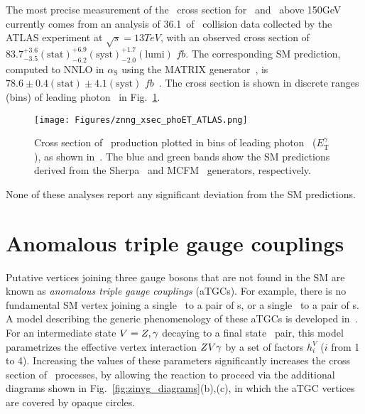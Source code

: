 The most precise measurement of the \zinvg\ cross section for \pTgamma\ and \MET\ above 150\unit{GeV} currently comes from an analysis of 36.1\fbinv\ of \Pp\Pp\ collision data
collected by the ATLAS experiment at $\sqrt{s} = 13\unit{TeV}$, with an observed cross section of $83.7^{+3.6}_{-3.5}\mathrm{(stat)}^{+6.9}_{-6.2}\mathrm{(syst)}^{+1.7}_{-2.0}\mathrm{(lumi)}$ $fb$.
The corresponding SM prediction, computed to NNLO in $\alpha_\mathrm{S}$ using the MATRIX generator~\cite{ref:epjc/s10052-018-5771-7}, is $78.6 \pm 0.4\mathrm{(stat)} \pm 4.1\mathrm{(syst)}$ $fb$~\cite{ref:CERN-EP-2018-220}.
The cross section is shown in discrete ranges (bins) of leading photon \pT\ in Fig.~\ref{fig:znng_xsec_phoET_ATLAS}.

\begin{figure}[hbtp]
  \begin{center}
    \texttt{[image: Figures/znng\_xsec\_phoET\_ATLAS.png]}
    \caption{
      Cross section of \zinvg\ production plotted in bins of leading photon \pT\ ($E^{\gamma}_\mathrm{T}$), as shown in~\cite{ref:CERN-EP-2018-220}.
      The blue and green bands show the SM predictions derived from the Sherpa~\cite{ref:1126-6708/2009/02/007} and MCFM~\cite{ref:JHEP07(2011)018} generators, respectively.
    }
    \label{fig:znng_xsec_phoET_ATLAS}
  \end{center}
\end{figure}

None of these analyses report any significant deviation from the SM predictions.

\section{Anomalous triple gauge couplings} \label{sec:introduction_aTGC}
Putative vertices joining three gauge bosons that are not found in the SM are known as \textit{anomalous triple gauge couplings} (aTGCs).
For example, there is no fundamental SM vertex joining a single \Pgamma\ to a pair of \PZ s, or a single \PZ\ to a pair of \Pgamma s. A model
describing the generic phenomenology of these aTGCs is developed in~\cite{ref:Nucl.Phys.0550-3213_87_90685-7, ref:PhysRevD.47.4889, ref:PhysRevD.62.113011}.
For an intermediate state $V = Z,\gamma$ decaying to a final state \PZ\Pgamma\ pair, this model parametrizes the effective vertex interaction $Z V\gamma$
by a set of factors $h_{i}^{V}$ ($i$ from 1 to 4). Increasing the values of these parameters significantly increases the cross section
of \zinvg\ processes, by allowing the reaction to proceed via the additional diagrams shown in Fig.~\ref{fig:zinvg_diagrams}(b),(c),
in which the aTGC vertices are covered by opaque circles.

